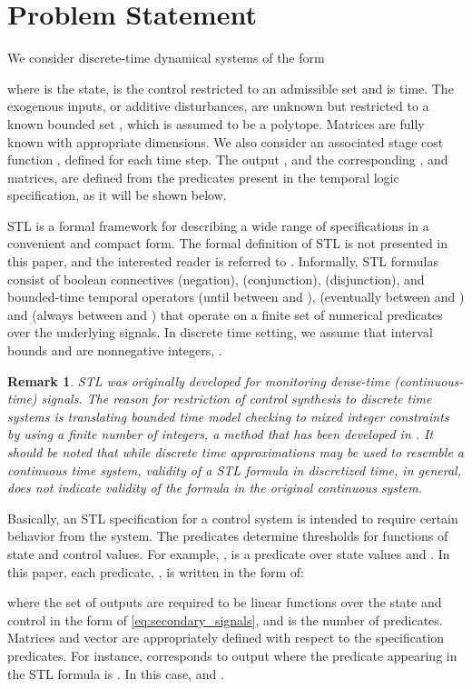 \documentclass[letterpaper, 10 pt, conference]{ieeeconf}
\newtheorem{remark}{Remark}
\begin{document}
\section{Problem Statement}
\label{sec:problem}
We consider discrete-time dynamical systems of the form


where  is the state,  is the control restricted to an admissible set
 and  is time. The exogenous inputs, or additive disturbances,  are unknown but restricted to a known bounded set , which is assumed to be a polytope. Matrices  are fully known with appropriate dimensions. We also consider an associated stage cost function , defined for each time step. The output , and the corresponding ,  and  matrices, are defined from the predicates present in the temporal logic specification, as it will be shown below. 


STL is a formal framework for describing a wide range of specifications in a convenient and compact form. The formal definition of STL is not presented in this paper, and the interested reader is referred to \cite{maler_stl,donze}. Informally, STL formulas consist of boolean connectives  (negation),  (conjunction),  (disjunction), and bounded-time temporal operators   (until between  and ),  (eventually between  and ) and  (always between  and ) that operate on a finite set of numerical predicates over the underlying signals. In discrete time setting, we assume that interval bounds  and  are nonnegative integers, .

\begin{remark}
STL was originally developed for monitoring dense-time (continuous-time) signals. The reason for restriction of control synthesis to discrete time systems is translating bounded time model checking to mixed integer constraints by using a finite number of integers, a method that has been developed in \cite{raman}. It should be noted that while discrete time approximations may be used to resemble a continuous time system, validity of a STL formula in discretized time, in general, does not indicate validity of the formula in the original continuous system. 
\end{remark}


Basically, an STL specification for a control system is intended to require certain behavior from the system. The predicates determine thresholds for functions of state and control values. For example, , is a  predicate over state values  and . 
In this paper, each predicate, , is written in the form of:

where the set of outputs  are required to be linear functions over the state and control in the form of \eqref{eq:secondary_signals}, and  is the number of predicates. Matrices  and vector  are appropriately defined with respect to the specification predicates. 
For instance,  corresponds to output  where the predicate appearing in the STL formula is . In this case,  and . 
\end{document}
